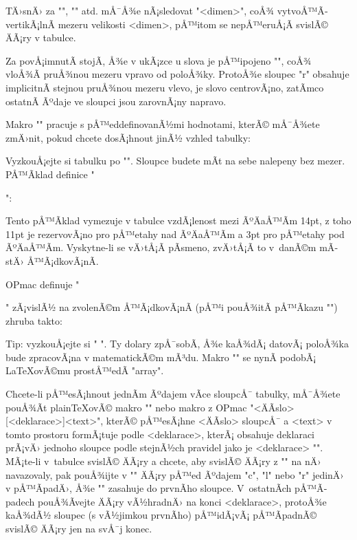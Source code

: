 TÄ›snÄ› za "\cr", "\crl" atd. mÅ¯Å¾e nÃ¡sledovat "\tskip<dimen>",
coÅ¾ vytvoÅ™Ã­ vertikÃ¡lnÃ­ mezeru velikosti <dimen>, pÅ™itom se nepÅ™eruÅ¡Ã­ svislÃ©
ÄÃ¡ry v tabulce.

Za povÅ¡imnutÃ­ stojÃ­, Å¾e v ukÃ¡zce u slova  je pÅ™ipojeno
"\hfil", coÅ¾ vloÅ¾Ã­ pruÅ¾nou mezeru vpravo od poloÅ¾ky. ProtoÅ¾e sloupec "r"
obsahuje implicitnÃ­ stejnou pruÅ¾nou mezeru vlevo, je slovo  centrovÃ¡no, 
zatÃ­mco ostatnÃ­ Ãºdaje ve sloupci jsou zarovnÃ¡ny
napravo. 

Makro "\table" pracuje s pÅ™eddefinovanÃ½mi hodnotami, kterÃ© mÅ¯Å¾ete zmÄ›nit,
pokud chcete dosÃ¡hnout jinÃ½ vzhled tabulky:

\begtt
\def\tabiteml{\enspace} %
\def\tabitemr{\enspace} %
\def\tabstrut{\strut}   %
\def\vvkern{1pt}   %
\def\hhkern{1pt}   %
\endtt

VyzkouÅ¡ejte si tabulku po "\def\tabiteml{}\def\tabitemr{}". Sloupce budete
mÃ­t na sebe nalepeny bez mezer. PÅ™Ã­klad definice "\tabstrut": 

\begtt
\def\tabstrut{\vrule height11pt depth3pt width0pt}
\endtt
%
Tento pÅ™Ã­klad vymezuje v tabulce vzdÃ¡lenost mezi ÃºÄaÅ™Ã­m 14pt, z toho
11pt je rezervovÃ¡no pro pÅ™etahy nad ÃºÄaÅ™Ã­m a 3pt pro pÅ™etahy pod
ÃºÄaÅ™Ã­m. Vyskytne-li se vÄ›tÅ¡Ã­ pÃ­smeno, zvÄ›tÅ¡Ã­ to v~danÃ©m mÃ­stÄ› Å™Ã¡dkovÃ¡nÃ­.

OPmac definuje "\strut" zÃ¡vislÃ½ na zvolenÃ©m Å™Ã¡dkovÃ¡nÃ­ (pÅ™i pouÅ¾itÃ­ pÅ™Ã­kazu
"\typosize") zhruba takto:

\begtt
\def\strut{\vrule height.709<baselineskip> depth.291<baselineskip> width0pt}
\endtt

Tip: vyzkouÅ¡ejte si
"\def\tabiteml{$\enspace} \def\tabitemr{\enspace$}". Ty dolary zpÅ¯sobÃ­, Å¾e
kaÅ¾dÃ¡ datovÃ¡ poloÅ¾ka bude zpracovÃ¡na v matematickÃ©m mÃ³du. Makro "\table" se
nynÃ­ podobÃ¡ \LaTeX{}ovÃ©mu prostÅ™edÃ­ "array".

Chcete-li pÅ™esÃ¡hnout jednÃ­m Ãºdajem vÃ­ce sloupcÅ¯ tabulky, mÅ¯Å¾ete pouÅ¾Ã­t
plain\TeX{}ovÃ© makro "" nebo makro z OPmac
"\mspan<ÄÃ­slo>[<deklarace>]{<text>}", kterÃ© pÅ™esÃ¡hne <ÄÃ­slo> sloupcÅ¯ a <text>
v tomto prostoru formÃ¡tuje podle <deklarace>, kterÃ¡ obsahuje deklaraci prÃ¡vÄ›
jednoho sloupce podle stejnÃ½ch pravidel jako je <deklarace> "\table". 
MÃ¡te-li v~tabulce svislÃ© ÄÃ¡ry
a chcete, aby svislÃ© ÄÃ¡ry z "\mspan" na nÄ› navazovaly, pak pouÅ¾ijte v
"\mspan" ÄÃ¡ry pÅ™ed Ãºdajem "c", "l" nebo "r" jedinÄ› v pÅ™Ã­padÄ›, Å¾e "\mspan" zasahuje do
prvnÃ­ho sloupce. V~ostatnÃ­ch pÅ™Ã­padech pouÅ¾Ã­vejte ÄÃ¡ry vÃ½hradnÄ› na konci
<deklarace>, protoÅ¾e kaÅ¾dÃ½ sloupec (s vÃ½jimkou prvnÃ­ho) pÅ™idÃ¡vÃ¡ pÅ™Ã­padnÃ©
svislÃ© ÄÃ¡ry jen na svÅ¯j konec.

